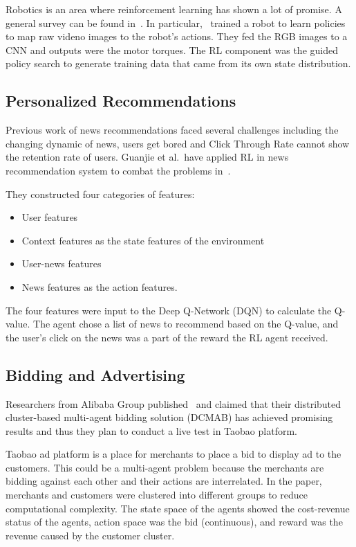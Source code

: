 \documentclass[letterpaper, 10 pt]{IEEEconf}
\begin{document}
Robotics is an area where reinforcement learning has shown a lot of
promise. A general survey can be found
in~\cite{kober2013reinforcement}. In particular,~\cite{levine2016end}
trained a robot to learn policies to map raw videno images to the
robot’s actions. They fed the RGB images to a CNN and outputs were the
motor torques. The RL component was the guided policy search to
generate training data that came from its own state distribution.

\subsection{Personalized Recommendations}

Previous work of news recommendations faced several challenges
including the changing dynamic of news, users get bored and Click
Through Rate cannot show the retention rate of users. Guanjie et
al.~have applied RL in news recommendation system to combat the
problems in~\cite{zheng2018drn}.

They constructed four categories of
features:
\begin{itemize}
	\item User features
	\item Context features as the state features of the environment
	\item User-news features
	\item News features as the action features.
\end{itemize}

The four features were input to the Deep Q-Network (DQN) to calculate
the Q-value. The agent chose a list of news to recommend based on the
Q-value, and the user’s click on the news was a part of the reward the
RL agent received.

\subsection{Bidding and Advertising}

Researchers from Alibaba Group published~\cite{jin2018real} and
claimed that their distributed cluster-based multi-agent bidding
solution (DCMAB) has achieved promising results and thus they plan to
conduct a live test in Taobao platform.

Taobao ad platform is a place for merchants to place a bid
to display ad to the customers. This could be a multi-agent problem
because the merchants are bidding against each other and their actions
are interrelated. In the paper, merchants and customers were clustered
into different groups to reduce computational complexity. The state
space of the agents showed the cost-revenue status of the agents,
action space was the bid (continuous), and reward was the revenue
caused by the customer cluster.
\end{document}

